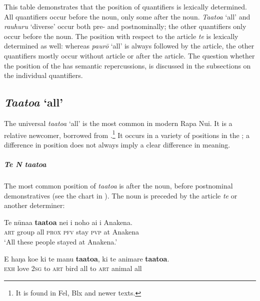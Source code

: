 
This table demonstrates that the position of quantifiers is lexically determined. All quantifiers occur before the noun, only some after the noun. \textit{Ta}\textit{{\ꞌ}ato{\ꞌ}a} ‘all’ and \textit{rauhuru} ‘diverse’ occur both pre- and postnominally; the other quantifiers only occur before the noun. The position with respect to the article \textit{te} is lexically determined as well: whereas \textit{paurō} ‘all’ is always followed by the article, the other quantifiers mostly occur without article or after the article. The question whether the position of the  has semantic repercussions, is discussed in the subsections on the individual quantifiers.

\subsection{\textit{Ta{\ꞌ}ato{\ꞌ}a} ‘all’}\label{sec:4.4.2}
The universal  \textit{ta{\ꞌ}ato{\ꞌ}a} ‘all’ is the most common  in modern Rapa Nui. It is a relative newcomer, borrowed from .\footnote{\label{fn:182}It is found in Fel, Blx and newer texts.} It occurs in a variety of positions in the ; a difference in position does not always imply a clear difference in meaning. 

\subparagraph{\textit{Te N ta{\ꞌ}ato{\ꞌ}a}} The most common position of \textit{ta{\ꞌ}ato{\ꞌ}a} is after the noun, before postnominal demonstratives (see the chart in ). The noun is preceded by the article \textit{te} or another determiner:

\ea\label{ex:4.49}
\gll Te nūna{\ꞌ}a \textbf{ta{\ꞌ}ato{\ꞌ}a} nei i noho ai {\ꞌ}i {\ꞌ}Anakena.\\
\textsc{art} group all \textsc{prox} \textsc{pfv} stay \textsc{pvp} at Anakena\\

\glt 
‘All these people stayed at Anakena.’ \textstyleExampleref{[R376.036]} 
\z

\ea\label{ex:4.50}
\gll E haŋa koe ki te manu \textbf{ta{\ꞌ}ato{\ꞌ}a}, ki te {\ꞌ}animare \textbf{ta{\ꞌ}ato{\ꞌ}a}. \\
\textsc{exh} love \textsc{2sg} to \textsc{art} bird all to \textsc{art} animal all \\


